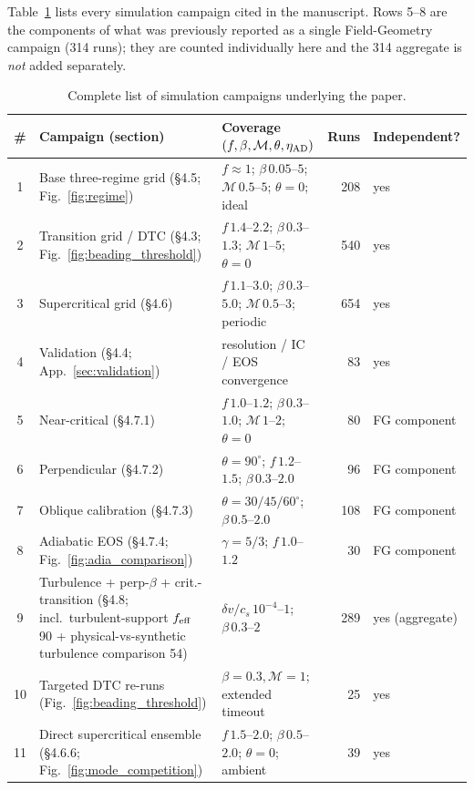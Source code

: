 \documentclass[usenatbib,twoside,twocolumn]{mnras}
\begin{document}
Table~\ref{tab:campaigns} lists every simulation campaign cited in the manuscript. Rows 5--8 are the components of what was previously reported as a single Field-Geometry campaign (314 runs); they are counted individually here and the 314 aggregate is \emph{not} added separately.

\begin{table}
\caption{Complete list of simulation campaigns underlying the paper.}
\label{tab:campaigns}
\begin{tabular}{cllrl}
\toprule
\# & Campaign (section) & Coverage $(f,\beta,\mathcal{M},\theta,\eta_{\rm AD})$ & Runs & Independent? \\
\midrule
1  & Base three-regime grid (\S4.5; Fig.~\ref{fig:regime}) & $f\approx1$; $\beta\,0.05$--$5$; $\mathcal{M}\,0.5$--$5$; $\theta=0$; ideal & 208 & yes \\
2  & Transition grid / DTC (\S4.3; Fig.~\ref{fig:beading_threshold}) & $f\,1.4$--$2.2$; $\beta\,0.3$--$1.3$; $\mathcal{M}\,1$--$5$; $\theta=0$ & 540 & yes \\
3  & Supercritical grid (\S4.6) & $f\,1.1$--$3.0$; $\beta\,0.3$--$5.0$; $\mathcal{M}\,0.5$--$3$; periodic & 654 & yes \\
4  & Validation (\S4.4; App.~\ref{sec:validation}) & resolution / IC / EOS convergence & 83 & yes \\
5  & Near-critical (\S4.7.1) & $f\,1.0$--$1.2$; $\beta\,0.3$--$1.0$; $\mathcal{M}\,1$--$2$; $\theta=0$ & 80 & FG component \\
6  & Perpendicular (\S4.7.2) & $\theta=90^\circ$; $f\,1.2$--$1.5$; $\beta\,0.3$--$2.0$ & 96 & FG component \\
7  & Oblique calibration (\S4.7.3) & $\theta=30/45/60^\circ$; $\beta\,0.5$--$2.0$ & 108 & FG component \\
8  & Adiabatic EOS (\S4.7.4; Fig.~\ref{fig:adia_comparison}) & $\gamma=5/3$; $f\,1.0$--$1.2$ & 30 & FG component \\
9  & Turbulence + perp-$\beta$ + crit.-transition (\S4.8; incl.\ turbulent-support $f_{\rm eff}$ 90 + physical-vs-synthetic turbulence comparison 54) & $\delta v/c_s\,10^{-4}$--$1$; $\beta\,0.3$--$2$ & 289 & yes (aggregate) \\
10 & Targeted DTC re-runs (Fig.~\ref{fig:beading_threshold}) & $\beta=0.3,\mathcal{M}=1$; extended timeout & 25 & yes \\
11 & Direct supercritical ensemble (\S4.6.6; Fig.~\ref{fig:mode_competition}) & $f\,1.5$--$2.0$; $\beta\,0.5$--$2.0$; $\theta=0$; ambient & 39 & yes \\

\end{tabular}
\end{table}
\end{document}
